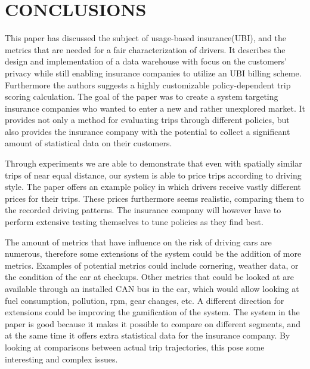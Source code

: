 \section{CONCLUSIONS}
This paper has discussed the subject of usage-based insurance(UBI), and the metrics that are needed for a fair characterization of drivers. It describes the design and implementation of a data warehouse with focus on the customers' privacy while still enabling insurance companies to utilize an UBI billing scheme. Furthermore the authors suggests a highly customizable policy-dependent trip scoring calculation.
The goal of the paper was to create a system targeting insurance companies who wanted to enter a new and rather unexplored market. It provides not only a method for evaluating trips through different policies, but also provides the insurance company with the potential to collect a significant amount of statistical data on their customers.

Through experiments we are able to demonstrate that even with spatially similar trips of near equal distance, our system is able to price trips according to driving style. The paper offers an example policy in which drivers receive vastly different prices for their trips. These prices furthermore seems realistic, comparing them to the recorded driving patterns. The insurance company will however have to perform extensive testing themselves to tune policies as they find best. 

The amount of metrics that have influence on the risk of driving cars are numerous, therefore some extensions of the system could be the addition of more metrics. Examples of potential metrics could include cornering, weather data, or the condition of the car at checkups. Other metrics that could be looked at are available through an installed CAN bus in the car, which would allow looking at fuel consumption, pollution, rpm, gear changes, etc.
A different direction for extensions could be improving the gamification of the system. The system in the paper is good because it makes it possible to compare on different segments, and at the same time it offers extra statistical data for the insurance company. By looking at comparisons between actual trip trajectories, this pose some interesting and complex issues.


\addtolength{\textheight}{-12cm}   %
